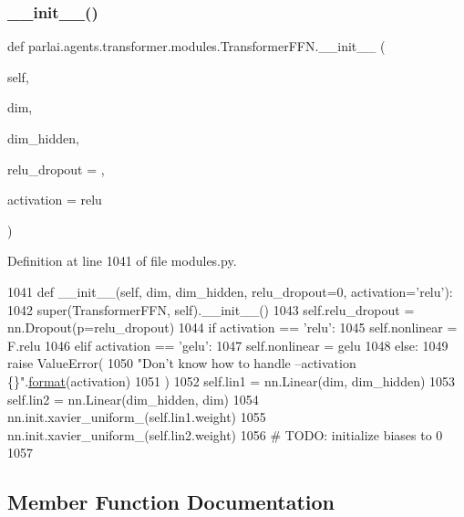 \subsubsection{\texorpdfstring{\+\_\+\+\_\+init\+\_\+\+\_\+()}{\_\_init\_\_()}}
{\footnotesize\ttfamily def parlai.\+agents.\+transformer.\+modules.\+Transformer\+F\+F\+N.\+\_\+\+\_\+init\+\_\+\+\_\+ (\begin{DoxyParamCaption}\item[{}]{self,  }\item[{}]{dim,  }\item[{}]{dim\+\_\+hidden,  }\item[{}]{relu\+\_\+dropout = {},  }\item[{}]{activation = {\ttfamily \textquotesingle{}relu\textquotesingle{}} }\end{DoxyParamCaption})}



Definition at line 1041 of file modules.\+py.


\begin{DoxyCode}
1041     \textcolor{keyword}{def }\_\_init\_\_(self, dim, dim\_hidden, relu\_dropout=0, activation='relu'):
1042         super(TransformerFFN, self).\_\_init\_\_()
1043         self.relu\_dropout = nn.Dropout(p=relu\_dropout)
1044         \textcolor{keywordflow}{if} activation == \textcolor{stringliteral}{'relu'}:
1045             self.nonlinear = F.relu
1046         \textcolor{keywordflow}{elif} activation == \textcolor{stringliteral}{'gelu'}:
1047             self.nonlinear = gelu
1048         \textcolor{keywordflow}{else}:
1049             \textcolor{keywordflow}{raise} ValueError(
1050                 \textcolor{stringliteral}{"Don't know how to handle --activation \{\}"}.\hyperlink{namespaceparlai_1_1chat__service_1_1services_1_1messenger_1_1shared__utils_a32e2e2022b824fbaf80c747160b52a76}{format}(activation)
1051             )
1052         self.lin1 = nn.Linear(dim, dim\_hidden)
1053         self.lin2 = nn.Linear(dim\_hidden, dim)
1054         nn.init.xavier\_uniform\_(self.lin1.weight)
1055         nn.init.xavier\_uniform\_(self.lin2.weight)
1056         \textcolor{comment}{# TODO: initialize biases to 0}
1057 
\end{DoxyCode}


\subsection{Member Function Documentation}
\mbox{\label{classparlai_1_1agents_1_1transformer_1_1modules_1_1TransformerFFN_a54f8d1ec7c0c4228f78a3be843ab3003}} 
